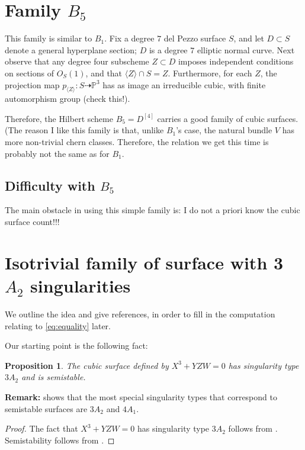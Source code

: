 \documentclass[12 pt]{amsart}
\newtheorem{proposition}{Proposition}[section]
\newenvironment{remark}{\textbf{Remark:}}{}
\renewcommand{\P}{\mathbb{P}}
\newcommand{\<}{\left\langle}
\renewcommand{\>}{\right\rangle}
\begin{document}
\section{Family $B_5$}
\label{sec:family-b_5-1}

This family is similar to $B_1$. Fix a degree $7$ del Pezzo surface
$S$, and let $D \subset S$ denote a general hyperplane section; $D$ is
a degree $7$ elliptic normal curve.  Next observe that any degree four
subscheme $Z \subset D$ imposes independent conditions on sections of
$O_{S}(1)$, and that $\langle Z \rangle \cap S = Z$.  Furthermore, for
each $Z$, the projection map
$p_{\langle Z \rangle}: S \dashrightarrow \P^{3}$ has as image an
irreducible cubic, with finite automorphism group (check this!).


Therefore, the Hilbert scheme $B_{5} = D^{[4]}$ carries a good family
of cubic surfaces.  (The reason I like this family is that, unlike
$B_1$'s case, the natural bundle $V$ has more non-trivial chern
classes. Therefore, the relation we get this time is probably not the
same as for $B_1$.

\subsection{Difficulty with $B_5$}
\label{sec:difficulty-with-b_5}

The main obstacle in using this simple family is: I do not a priori
know the cubic surface count!!!

\section{Isotrivial family of surface with 3 $A_2$ singularities}

We outline the idea and give references, in order to fill in the computation relating to \eqref{eq:equality} later. 

Our starting point is the following fact:
\begin{proposition}
\label{prop:3A2}
The cubic surface defined by $X^3 + YZW = 0$ has singularity type $3A_2$ and is semistable.
\end{proposition}

\begin{remark}
\cite[Proposition 2.2]{N05} shows that the most special singularity types that correspond to semistable surfaces are $3A_2$ and $4A_1$. 
\end{remark}

\begin{proof}
The fact that $X^3 + YZW=0$ has singularity type $3A_2$ follows from \cite[Proof of 3.1.12]{N00}. Semistability follows from \cite[Proposition 2.3]{N05}.
\end{proof}
\end{document}
